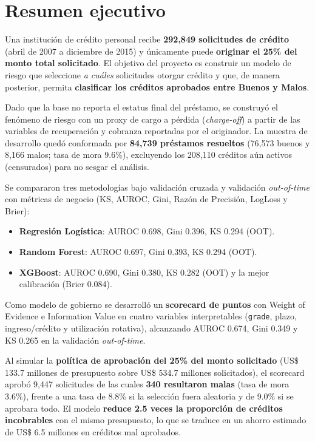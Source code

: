 \documentclass[11pt, letterpaper]{article}
\newcommand{\bt}[1]{\textbf{#1}}
\begin{document}
\section*{Resumen ejecutivo}

Una institución de crédito personal recibe \bt{292,849 solicitudes de crédito} (abril de
2007 a diciembre de 2015) y únicamente puede \bt{originar el 25\% del monto total
solicitado}. El objetivo del proyecto es construir un modelo de riesgo que
seleccione \emph{a cuáles} solicitudes otorgar crédito y que, de manera
posterior, permita \bt{clasificar los créditos aprobados entre Buenos y Malos}.

Dado que la base no reporta el estatus final del préstamo, se construyó el
fenómeno de riesgo con un proxy de cargo a pérdida (\emph{charge-off}) a partir
de las variables de recuperación y cobranza reportadas por el originador. La
muestra de desarrollo quedó conformada por \bt{84,739 préstamos resueltos}
(76,573 buenos y 8,166 malos; tasa de mora 9.6\%), excluyendo los 208,110
créditos aún activos (censurados) para no sesgar el análisis.

Se compararon tres metodologías bajo validación cruzada y validación
\emph{out-of-time} con métricas de negocio (KS, AUROC, Gini, Razón de Precisión,
LogLoss y Brier):

\begin{itemize}[leftmargin=2em]
  \item \bt{Regresión Logística}: AUROC 0.698, Gini 0.396, KS 0.294 (OOT).
  \item \bt{Random Forest}: AUROC 0.697, Gini 0.393, KS 0.294 (OOT).
  \item \bt{XGBoost}: AUROC 0.690, Gini 0.380, KS 0.282 (OOT) y la mejor
        calibración (Brier 0.084).
\end{itemize}

Como modelo de gobierno se desarrolló un \bt{scorecard de puntos} con
Weight of Evidence e Information Value en cuatro variables interpretables
(\texttt{grade}, plazo, ingreso/crédito y utilización rotativa), alcanzando
AUROC 0.674, Gini 0.349 y KS 0.265 en la validación \emph{out-of-time}.

Al simular la \bt{política de aprobación del 25\% del monto solicitado}
(US\$ 133.7 millones de presupuesto sobre US\$ 534.7 millones solicitados),
el scorecard aprobó 9,447 solicitudes de las cuales \bt{340 resultaron malas}
(tasa de mora 3.6\%), frente a una tasa de 8.8\% si la selección fuera
aleatoria y de 9.0\% si se aprobara todo. El modelo \bt{reduce 2.5 veces la
proporción de créditos incobrables} con el mismo presupuesto, lo que se
traduce en un ahorro estimado de US\$ 6.5 millones en créditos mal aprobados.
\end{document}
